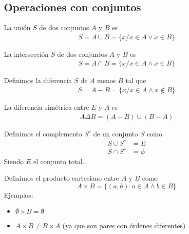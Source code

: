 \documentclass{../Topologia.tex}
\begin{document}
\subsection{Operaciones con conjuntos}
\begin{defin}
	La unión $S$ de dos conjuntos $A$ y $B$ es
	\begin{equation}
		\begin{split}
			S = A \cup B = \{x / x \in A \vee x \in B \}
		\end{split}
	\end{equation}
\end{defin}
\begin{defin}
	La intersección $S$ de dos conjuntos $A$ y $B$ es
	\begin{equation}
		\begin{split}
			S = A \cap B = \{ x / x \in A \wedge x \in B \}
		\end{split}
	\end{equation}
\end{defin}
\begin{defin}
	Definimos la diferencia $S$ de $A$ menos $B$ tal que
	\begin{equation}
		\begin{split}
			S = A - B = \{ x / x \in A \wedge x \notin B  \}
		\end{split}
	\end{equation}
\end{defin}
\begin{defin}
	La diferencia simétrica entre $E$ y $A$ es
	\begin{equation}
		\begin{split}
			A \Delta B = (A-B)\cup (B-A)
		\end{split}
	\end{equation}
\end{defin}

\begin{defin}
	Definimos el complemento $S^{c}$ de un conjunto $S$ como
	\begin{equation}
		\begin{split}
			S \cup S^{c} &= E\\
			S \cap S^{c} &= \phi
		\end{split}
	\end{equation}
	Siendo $E$ el conjunto total. 
\end{defin}
\begin{defin}
	Definimos el producto cartesiano entre $A$ y $B$ como
	\[
		A \times B = \{ (a,b): a \in A \wedge b \in B \}
	\]
	Ejemplos:
	\begin{itemize}
		\item $\emptyset \times B = \emptyset$
		\item $A \times B \neq B \times A$ (ya que son pares con órdenes diferentes)
	\end{itemize}
\end{defin}
\end{document}
